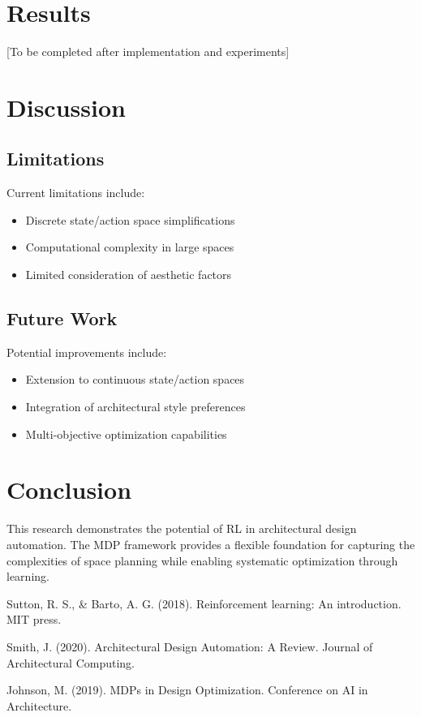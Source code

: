 \documentclass[12pt]{article}
\begin{document}
\section{Results}
[To be completed after implementation and experiments]

\section{Discussion}
\subsection{Limitations}
Current limitations include:
\begin{itemize}
    \item Discrete state/action space simplifications
    \item Computational complexity in large spaces
    \item Limited consideration of aesthetic factors
\end{itemize}

\subsection{Future Work}
Potential improvements include:
\begin{itemize}
    \item Extension to continuous state/action spaces
    \item Integration of architectural style preferences
    \item Multi-objective optimization capabilities
\end{itemize}

\section{Conclusion}
This research demonstrates the potential of RL in architectural design automation. The MDP framework provides a flexible foundation for capturing the complexities of space planning while enabling systematic optimization through learning.


\begin{thebibliography}{9}
Sutton, R. S., \& Barto, A. G. (2018). Reinforcement learning: An introduction. MIT press.

Smith, J. (2020). Architectural Design Automation: A Review. Journal of Architectural Computing.

Johnson, M. (2019). MDPs in Design Optimization. Conference on AI in Architecture.
\end{thebibliography}
\end{document}
